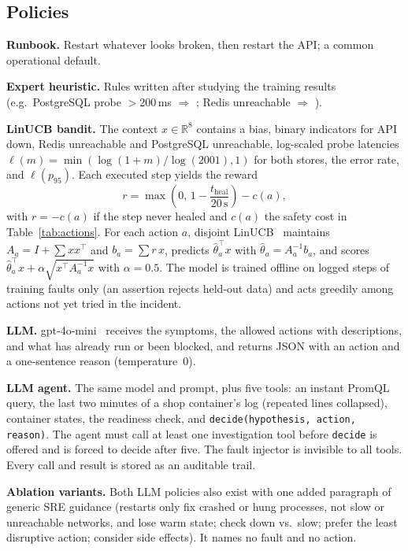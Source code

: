 \subsection{Policies}
\label{sec:policies}
\textbf{Runbook.} Restart whatever looks broken, then restart the API; a common operational default.

\textbf{Expert heuristic.} Rules written after studying the training results (e.g.\ PostgreSQL
probe $>$200\,ms $\Rightarrow$ ; Redis unreachable $\Rightarrow$ ).

\textbf{LinUCB bandit.} The context $x \in \mathbb{R}^8$ contains a bias, binary indicators for API
down, Redis unreachable and PostgreSQL unreachable, log-scaled probe latencies
$\ell(m)=\min(\log(1+m)/\log(2001),1)$ for both stores, the error rate, and $\ell(p_{95})$. Each
executed step yields the reward
\begin{equation}
r = \max\!\left(0,\, 1 - \frac{t_{\text{heal}}}{20\,\text{s}}\right) - c(a),
\end{equation}
with $r=-c(a)$ if the step never healed and $c(a)$ the safety cost in Table~\ref{tab:actions}. For
each action $a$, disjoint LinUCB~\cite{li2010linucb} maintains $A_a = I + \sum x x^\top$ and
$b_a = \sum r\,x$, predicts $\hat\theta_a^\top x$ with $\hat\theta_a = A_a^{-1} b_a$, and scores
$\hat\theta_a^\top x + \alpha\sqrt{x^\top A_a^{-1} x}$ with $\alpha=0.5$. The model is trained
offline on logged steps of training faults only (an assertion rejects held-out data) and acts
greedily among actions not yet tried in the incident.

\textbf{LLM.} gpt-4o-mini~\cite{openai2024mini} receives the symptoms, the allowed actions with
descriptions, and what has already run or been blocked, and returns JSON with an action and a
one-sentence reason (temperature~0).

\textbf{LLM agent.} The same model and prompt, plus five tools: an instant PromQL query, the last
two minutes of a shop container's log (repeated lines collapsed), container states, the readiness
check, and \texttt{decide(hypothesis, action, reason)}. The agent must call at least one
investigation tool before \texttt{decide} is offered and is forced to decide after five. The fault
injector is invisible to all tools. Every call and result is stored as an auditable trail.

\textbf{Ablation variants.} Both LLM policies also exist with one added paragraph of generic SRE
guidance (restarts only fix crashed or hung processes, not slow or unreachable networks, and lose
warm state; check down vs.\ slow; prefer the least disruptive action; consider side effects). It
names no fault and no action.

